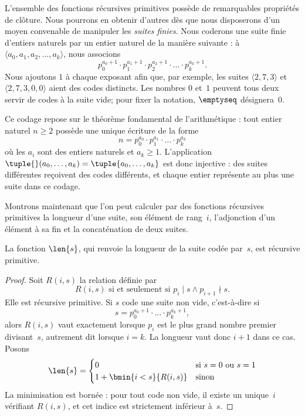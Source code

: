 \documentclass[../../../include/open-logic-section]{subfiles}
\begin{document}

L'ensemble des fonctions récursives primitives possède de
remarquables propriétés de clôture. Nous pourrons en obtenir
d'autres dès que nous disposerons d'un moyen convenable de
manipuler les \emph{suites finies}. Nous coderons une suite
finie d'entiers naturels par un entier naturel de la manière
suivante : à
$\langle a_0,a_1,a_2,\dots,a_k\rangle$, nous associons
\[
p_0^{a_0+1} \cdot p_1^{a_1+1} \cdot p_2^{a_2+1} \cdot \dots \cdot
p_k^{a_k+1}.
\]
Nous ajoutons $1$ à chaque exposant afin que, par exemple,
les suites $\langle 2,7,3\rangle$ et
$\langle 2,7,3,0,0\rangle$ aient des codes distincts.
Les nombres $0$ et~$1$ peuvent tous deux servir de codes à
la suite vide; pour fixer la notation, $\emptyseq$
désignera~$0$.

Ce codage repose sur le théorème fondamental de
l'arithmétique : tout entier naturel $n\geq2$ possède une
unique écriture de la forme
\[
n = p_0^{a_0} \cdot p_1^{a_1} \cdot \dots \cdot p_k^{a_k}
\]
où les $a_i$ sont des entiers naturels et $a_k\geq1$.
L'application
$\tuple{}(a_0,\dots,a_k)=\tuple{a_0,\dots,a_k}$
est donc injective : des suites différentes reçoivent des
codes différents, et chaque entier représente au plus une
suite dans ce codage.

Montrons maintenant que l'on peut calculer par des fonctions
récursives primitives la longueur d'une suite, son élément
de rang~$i$, l'adjonction d'un élément à sa fin et la
concaténation de deux suites.

\begin{prop}
  La fonction $\len{s}$, qui renvoie la longueur de la suite
  codée par~$s$, est récursive primitive.
\end{prop}

\begin{proof}
  Soit $R(i,s)$ la relation définie par
  \[
  R(i, s) \text{ si et seulement si }
  p_i \mid s \land p_{i+1} \nmid s.
  \]
  Elle est récursive primitive. Si $s$ code une suite non vide,
  c'est-à-dire si
  \[
  s = p_0^{a_0+1} \cdot \dots \cdot p_{k}^{a_{k}+1},
  \]
  alors $R(i,s)$ vaut exactement lorsque $p_i$ est le plus
  grand nombre premier divisant~$s$, autrement dit lorsque
  $i=k$. La longueur vaut donc $i+1$ dans ce cas. Posons
  \[
  \len{s} =
  \begin{cases}
    0 & \text{si $s = 0$ ou $s = 1$} \\
    1 + \bmin{i < s}{R(i, s)} & \text{sinon}
  \end{cases}
  \]
  La minimisation est bornée : pour tout code non vide,
  il existe un unique~$i$ vérifiant $R(i,s)$, et cet
  indice est strictement inférieur à~$s$.
\end{proof}
\end{document}

